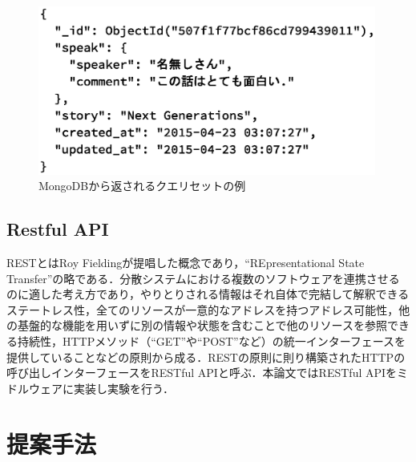 \documentclass[a4paper,11pt]{ujreport}
\begin{document}
\begin{figure}[htbp]
	\begin{center}
		\includegraphics[width=30em, trim=10em 18em 10em 0em]{src/MongoJson.eps} %
	\end{center}
	\caption{MongoDBから返されるクエリセットの例}
	\label{MongoJson}
\end{figure}



\section{Restful API}
RESTとはRoy Fieldingが提唱した概念であり\cite{fielding2000architectural}，“REpresentational State Transfer”の略である．分散システムにおける複数のソフトウェアを連携させるのに適した考え方であり，やりとりされる情報はそれ自体で完結して解釈できるステートレス性，全てのリソースが一意的なアドレスを持つアドレス可能性，他の基盤的な機能を用いずに別の情報や状態を含むことで他のリソースを参照できる持続性，HTTPメソッド（“GET”や“POST”など）の統一インターフェースを提供していることなどの原則から成る．RESTの原則に則り構築されたHTTPの呼び出しインターフェースをRESTful APIと呼ぶ．本論文ではRESTful APIをミドルウェアに実装し実験を行う．

\chapter{提案手法}
\label{chap:ProposedAlgorithm}
\end{document}
